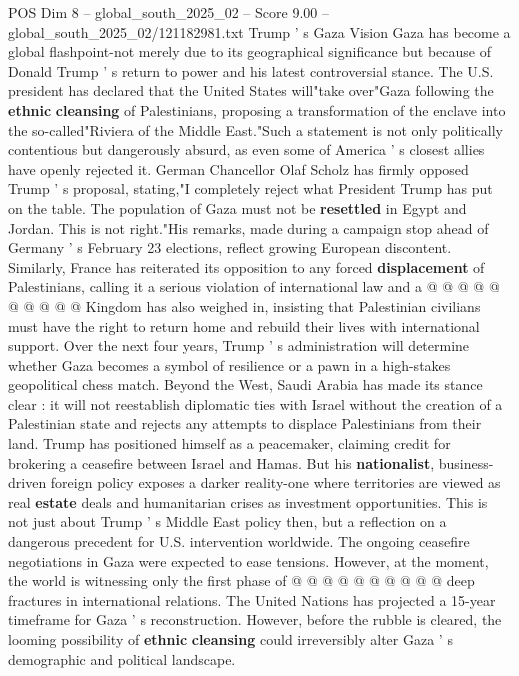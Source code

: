 \begin{textsample}{POS Dim 8 – global\_south\_2025\_02 – Score 9.00 – global\_south\_2025\_02/121182981.txt}  \label{ex:f8_pos_072}
Trump ' s Gaza Vision Gaza has become a global flashpoint-not merely due to its geographical significance but because of Donald Trump ' s return to power and his latest controversial stance.
The U.S. president has declared that the United States will"take over"Gaza following the \textbf{ethnic} \textbf{cleansing} of Palestinians, proposing a transformation of the enclave into the so-called"Riviera of the Middle East."Such a statement is not only politically contentious but dangerously absurd, as even some of America ' s closest allies have openly rejected it.
German Chancellor Olaf Scholz has firmly opposed Trump ' s proposal, stating,"I completely reject what President Trump has put on the table.
The population of Gaza must not be \textbf{resettled} in Egypt and Jordan.
This is not right."His remarks, made during a campaign stop ahead of Germany ' s February 23 elections, reflect growing European discontent.
Similarly, France has reiterated its opposition to any forced \textbf{displacement} of Palestinians, calling it a serious violation of international law and a @ @ @ @ @ @ @ @ @ @ Kingdom has also weighed in, insisting that Palestinian civilians must have the right to return home and rebuild their lives with international support.
Over the next four years, Trump ' s administration will determine whether Gaza becomes a symbol of resilience or a pawn in a high-stakes geopolitical chess match.
Beyond the West, Saudi Arabia has made its stance clear : it will not reestablish diplomatic ties with Israel without the creation of a Palestinian state and rejects any attempts to displace Palestinians from their land.
Trump has positioned himself as a peacemaker, claiming credit for brokering a ceasefire between Israel and Hamas.
But his \textbf{nationalist}, business-driven foreign policy exposes a darker reality-one where territories are viewed as real \textbf{estate} deals and humanitarian crises as investment opportunities.
This is not just about Trump ' s Middle East policy then, but a reflection on a dangerous precedent for U.S. intervention worldwide.
The ongoing ceasefire negotiations in Gaza were expected to ease tensions.
However, at the moment, the world is witnessing only the first phase of @ @ @ @ @ @ @ @ @ @ deep fractures in international relations.
The United Nations has projected a 15-year timeframe for Gaza ' s reconstruction.
However, before the rubble is cleared, the looming possibility of \textbf{ethnic} \textbf{cleansing} could irreversibly alter Gaza ' s demographic and political landscape.

\end{textsample}
